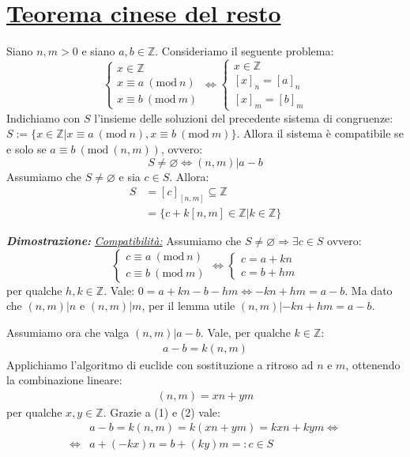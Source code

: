 \documentclass[oneside]{book}
\theoremstyle{remark}
\newcommand{\Mod}[1]{\ (\mathrm{mod}\ #1)} %
\begin{document}
\section{\underline{Teorema cinese del resto}}
\begin{tcolorbox}[enhanced, breakable, title={Teolema cinese del lesto}]
Siano $n,m>0$ e siano $a,b \in \mathbb{Z}$. Consideriamo il seguente problema:
\[
    \begin{cases}
        x \in \mathbb{Z}\\
        x \equiv a \Mod{n}\\
        x \equiv b \Mod{m}
    \end{cases}
    \Longleftrightarrow
    \begin{cases}
        x \in \mathbb{Z}\\
        [x]_n = [a]_n\\
        [x]_m = [b]_m
    \end{cases}
\]
Indichiamo con $S$ l'insieme delle soluzioni del precedente sistema di congruenze:
$S:=\{ x \in \mathbb{Z}| x \equiv a \Mod{n}, x \equiv b \Mod{m} \}$.
Allora il sistema è compatibile se e solo se $a \equiv b \Mod{(n,m)}$, ovvero:
\[ S\not = \varnothing \Longleftrightarrow (n,m)|a-b \]
Assumiamo che $S \not = \varnothing$ e sia $c\in S$. Allora:
\begin{align*}
    S &=[c]_{[n,m]} \subseteq \mathbb{Z}\\
    &=\{ c+k[n,m] \in \mathbb{Z}| k \in \mathbb{Z} \}
\end{align*}

\emph{\textbf{Dimostrazione:}} \underline{\emph{Compatibilità:}} Assumiamo che
$S \not = \varnothing \Rightarrow \exists c \in S$ ovvero:
\[
    \begin{cases}
        c \equiv a \Mod{n}\\
        c \equiv b \Mod{m}
    \end{cases}
    \Longleftrightarrow
    \begin{cases}
        c = a+kn\\
        c = b+hm
    \end{cases}
\]
per qualche $h,k \in \mathbb{Z}$. Vale: $ 0 = a+kn - b-hm \Leftrightarrow -kn+hm = a-b $.
Ma dato che $(n,m)|n$ e $(n,m)|m$, per il lemma utile $(n,m)|-kn+hm = a-b$.

Assumiamo ora che valga $(n,m)|a-b$. Vale, per qualche $k \in \mathbb{Z}$:
\begin{align}
    a-b = k(n,m)
\end{align}
Applichiamo l'algoritmo di euclide con sostituzione a ritroso ad $n$ e $m$, ottenendo la
combinazione lineare:
\begin{align}
    (n,m) = xn+ym
\end{align}
per qualche $x,y \in \mathbb{Z}$. Grazie a (1) e (2) vale:
\begin{align*}
    &a-b=k(n,m)=k(xn+ym)=kxn+kym \Leftrightarrow\\
    \Leftrightarrow &a+(-kx)n=b+(ky)m =: c \in S
\end{align*}


\end{tcolorbox}
\end{document}
